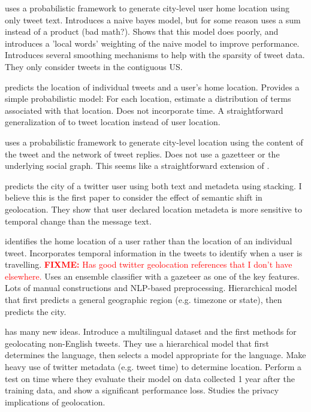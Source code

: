 \documentclass[sigconf,10pt]{acmart}
\newcommand{\fixme}[1]{\textcolor{red}{\textbf{FIXME:} {#1}}}
\begin{document}
\citet{cheng2010you} uses a probabilistic framework to generate city-level user home location using only tweet text.
Introduces a naive bayes model, but for some reason uses a sum instead of a product (bad math?).
Shows that this model does poorly,
and introduces a 'local words' weighting of the naive model to improve performance.
Introduces several smoothing mechanisms to help with the sparsity of tweet data.
They only consider tweets in the contiguous US.

\citet{kinsella2011m} predicts the location of individual tweets and a user's home location.
Provides a simple probabilistic model: 
For each location, estimate a distribution of terms associated with that location.
Does not incorporate time.
A straightforward generalization of \citet{cheng2010you} to tweet location instead of user location.

\citet{li2012towards} uses a probabilistic framework to generate city-level location using the content of the tweet and the network of tweet replies.
Does not use a gazetteer or the underlying social graph.
This seems like a straightforward extension of \citet{cheng2010you}.

\citet{han2013stacking} predicts the city of a twitter user using both text and metadeta using stacking.
I believe this is the first paper to consider the effect of semantic shift in geolocation.
They show that user declared location metadeta is more sensitive to temporal change than the message text.

\citet{mahmud2014home} identifies the home location of a user rather than the location of an individual tweet.
Incorporates temporal information in the tweets to identify when a user is travelling.
\fixme{Has good twitter geolocation references that I don't have elsewhere.}
Uses an ensemble classifier with a gazeteer as one of the key features.
Lots of manual constructions and NLP-based preprocessing.
Hierarchical model that first predicts a general geographic region (e.g. timezone or state), then predicts the city.

\citet{han2014text} has many new ideas.
Introduce a multilingual dataset and the first methods for geolocating non-English tweets.
They use a hierarchical model that first determines the language,
then selects a model appropriate for the language.
Make heavy use of twitter metadata (e.g. tweet time) to determine location.
Perform a test on time where they evaluate their model on data collected 1 year after the training data, and show a significant performance loss.
Studies the privacy implications of geolocation.
\end{document}
